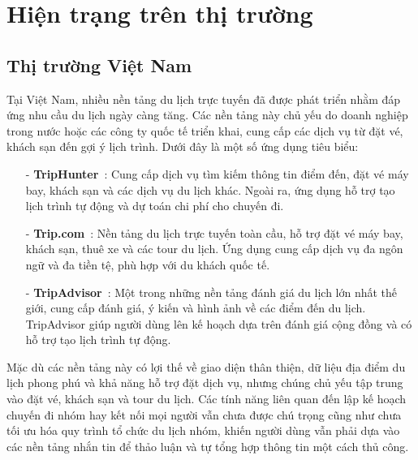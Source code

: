 \section{Hiện trạng trên thị trường}
\subsection{Thị trường Việt Nam}

Tại Việt Nam, nhiều nền tảng du lịch trực tuyến đã được phát triển nhằm đáp ứng nhu cầu du lịch ngày càng tăng. Các nền tảng này chủ yếu do doanh nghiệp trong nước hoặc các công ty quốc tế triển khai, cung cấp các dịch vụ từ đặt vé, khách sạn đến gợi ý lịch trình. Dưới đây là một số ứng dụng tiêu biểu:

\begin{itemize}
    \item[-]\textbf{TripHunter}~\cite{triphunter}: Cung cấp dịch vụ tìm kiếm thông tin điểm đến, đặt vé máy bay, khách sạn và các dịch vụ du lịch khác. Ngoài ra, ứng dụng hỗ trợ tạo lịch trình tự động và dự toán chi phí cho chuyến đi.

    \item[-]\textbf{Trip.com}~\cite{tripcom}: Nền tảng du lịch trực tuyến toàn cầu, hỗ trợ đặt vé máy bay, khách sạn, thuê xe và các tour du lịch. Ứng dụng cung cấp dịch vụ đa ngôn ngữ và đa tiền tệ, phù hợp với du khách quốc tế.

    \item[-]\textbf{TripAdvisor}~\cite{tripadvisor}: Một trong những nền tảng đánh giá du lịch lớn nhất thế giới, cung cấp đánh giá, ý kiến và hình ảnh về các điểm đến du lịch. TripAdvisor giúp người dùng lên kế hoạch dựa trên đánh giá cộng đồng và có hỗ trợ tạo lịch trình tự động.


\end{itemize}

Mặc dù các nền tảng này có lợi thế về giao diện thân thiện, dữ liệu địa điểm du lịch phong phú và khả năng hỗ trợ đặt dịch vụ, nhưng chúng chủ yếu tập trung vào đặt vé, khách sạn và tour du lịch. Các tính năng liên quan đến lập kế hoạch chuyến đi nhóm hay kết nối mọi người vẫn chưa được chú trọng cũng như chưa tối ưu hóa quy trình tổ chức du lịch nhóm, khiến người dùng vẫn phải dựa vào các nền tảng nhắn tin để thảo luận và tự tổng hợp thông tin một cách thủ công.


